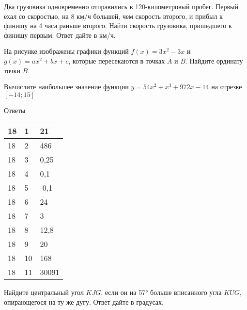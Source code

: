 \documentclass[twocolumn]{article}
\begin{document}
\begin{taskBN}{9}
Два грузовика одновременно отправились в 120-километровый пробег. Первый ехал со скоростью, на 8 км/ч большей, чем скорость второго, и прибыл к финишу на 4 часа раньше второго. Найти скорость грузовика, пришедшего к финишу первым. Ответ дайте в км/ч.
\end{taskBN}

\begin{taskBN}{10}
На рисунке изображены графики функций $f(x)=3x^{2}-3x$ и $g(x)=ax^{2} +bx+c$, которые пересекаются в точках $A$ и $B$. Найдите ординату точки $B$.\vspace{2.5cm}
\end{taskBN}

\begin{taskBN}{11}
Вычислите наибольшее значение функции $y = 54x^{2}+x^{3}+972x-14$ на отрезке $\left[-14;15 \right]$
\end{taskBN}

\newpage
 Ответы

\begin{table}[h]\begin{tabular}{|l|l|l|}
\hline
18 & 1 & 21
\\
\hline
18 & 2 & 486
\\
\hline
18 & 3 & 0,25
\\
\hline
18 & 4 & 0,1
\\
\hline
18 & 5 & -0,1
\\
\hline
18 & 6 & 24
\\
\hline
18 & 7 & 3
\\
\hline
18 & 8 & 12,8
\\
\hline
18 & 9 & 20
\\
\hline
18 & 10 & 168
\\
\hline
18 & 11 & 30091
\\
\hline
\end{tabular}\end{table}



\newpage




\cleardoublepage
\def\examvart{Вариант 17.3}
\normalsize

\startpartone
\large




\begin{taskBN}{1}
Найдите центральный угол $KJG$, если он на 57° больше вписанного угла $KUG$, опирающегося на ту же дугу. Ответ дайте в градусах.
\end{taskBN}
\end{document}
